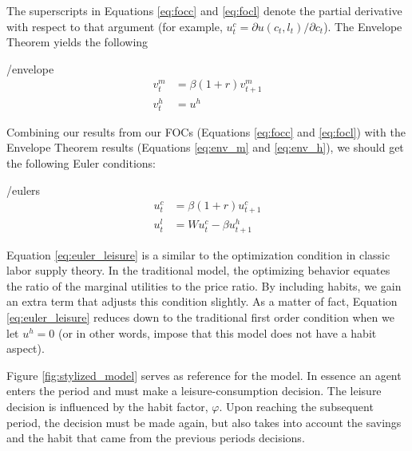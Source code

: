 \documentclass[ProjectMMD]{subfiles}
\begin{document}
The superscripts in Equations \eqref{eq:focc} and \eqref{eq:focl} denote the partial derivative with respect to that argument (for example, $u^c_t = \partial u(c_t,l_t) / \partial c_t$). The Envelope Theorem yields the following

\hypertarget{envelope}{}
\begin{verbatimwrite}{\EqDir/envelope}
  \begin{align}
    v_t^m &= \beta(1+r)v_{t+1}^m \label{eq:env_m} \\
    v_t^h &= u^h \label{eq:env_h}
  \end{align}
\end{verbatimwrite}

Combining our results from our FOCs (Equations \eqref{eq:focc} and \eqref{eq:focl}) with the Envelope Theorem results (Equations \eqref{eq:env_m} and \eqref{eq:env_h}), we should get the following Euler conditions:

\hypertarget{eulers}{}
\begin{verbatimwrite}{\EqDir/eulers}
  \begin{align}
    u^c_t &= \beta(1+r)u^c_{t+1} \label{eq:euler_cons} \\
    u_t^l &= W u^c_t - \beta u^h_{t+1} \label{eq:euler_leisure}
  \end{align}
\end{verbatimwrite}


Equation \eqref{eq:euler_leisure} is a similar to the optimization condition in classic labor supply theory. In the traditional model, the optimizing behavior equates the ratio of the marginal utilities to the price ratio. By including habits, we gain an extra term that adjusts this condition slightly. As a matter of fact, Equation \eqref{eq:euler_leisure} reduces down to the traditional first order condition when we let $u^h=0$ (or in other words, impose that this model does not have a habit aspect).

\providecommand{\figName}{stylized_model} %
\providecommand{\figFile}{\figName} %
\hypertarget{\figFile}{}
Figure \ref{fig:stylized_model} serves as reference for the model. In essence an agent enters the period and must make a leisure-consumption decision. The leisure decision is influenced by the habit factor, $\varphi$. Upon reaching the subsequent period, the decision must be made again, but also takes into account the savings and the habit that came from the previous periods decisions.
\end{document}
